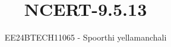 \documentclass[journal]{IEEEtran}
\begin{document}

\vspace{3cm}

\title{NCERT-9.5.13}
\author{EE24BTECH11065 - Spoorthi yellamanchali
}
{\let\newpage\relax\maketitle}

\renewcommand{\thefigure}{\theenumi}
\renewcommand{\thetable}{\theenumi}
\setlength{\intextsep}{10pt} %


\renewcommand{\thetable}{\theenumi}
\end{document}
